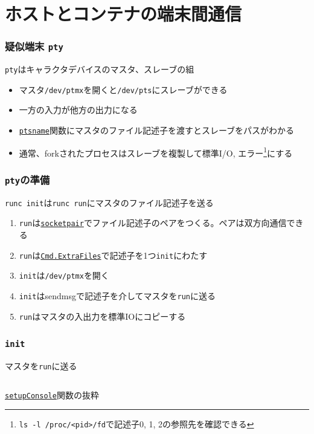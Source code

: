 \documentclass[unicode, 14pt, aspectratio=169]{beamer}
\begin{document}
\section{ホストとコンテナの端末間通信}
\begin{frame}
  \frametitle{疑似端末 \texttt{pty}}
  \texttt{pty}はキャラクタデバイスのマスタ、スレーブの組\supercite{pty}
  \begin{itemize}[leftmargin=0.8cm,label=$\circ$]
  \item マスタ\texttt{/dev/ptmx}を開くと\texttt{/dev/pts}にスレーブができる
  \item 一方の入力が他方の出力になる
  \item \href{https://man7.org/linux/man-pages/man3/ptsname.3.html}{\texttt{ptsname}}関数にマスタのファイル記述子を渡すとスレーブをパスがわかる
  \item 通常、forkされたプロセスはスレーブを複製して標準I/O, エラー\footnote{\scriptsize{\texttt{ls -l /proc/<pid>/fd}で記述子0, 1, 2の参照先を確認できる}}にする\supercite{advancedunix}
  \end{itemize}
\end{frame}
\begin{frame}
  \frametitle{\texttt{pty}の準備}

  \texttt{runc init}は\texttt{runc run}にマスタのファイル記述子を送る
  \begin{enumerate}[leftmargin=1.2cm]
  \item \texttt{run}は\href{https://man7.org/linux/man-pages/man2/socketpair.2.html}{\texttt{socketpair}}でファイル記述子のペアをつくる。ペアは双方向通信できる
  \item \texttt{run}は\href{https://pkg.go.dev/os/exec\#Cmd}{\texttt{Cmd.ExtraFiles}}で記述子を1つ\texttt{init}にわたす 
  \item \texttt{init}は\texttt{/dev/ptmx}を開く
  \item \texttt{init}はsendmsgで記述子を介してマスタを\texttt{run}に送る
  \item \texttt{run}はマスタの入出力を標準IOにコピーする
  \end{enumerate}
\end{frame}
\begin{frame}
  \frametitle{\texttt{init}}
  マスタを\texttt{run}に送る
  \begin{center}
    \inputminted{go}{code/tty_init.go}
    \href{https://github.com/opencontainers/runc/blob/7cb363254b69e10320360b63fb73e0ffb5da7bf2/libcontainer/init_linux.go\#L371}{\texttt{setupConsole}}関数の抜粋
  \end{center}
\end{frame}
\end{document}
